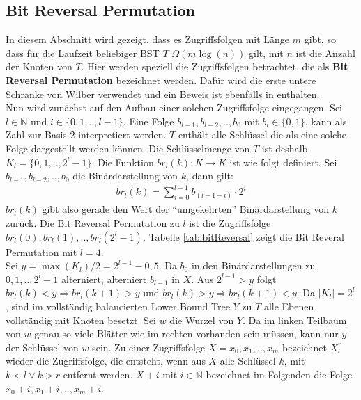 \documentclass[a4paper,12pt]{article}
\begin{document}
\subsection{Bit Reversal Permutation } \label{abschnittBitReversal}
In diesem Abschnitt wird gezeigt, dass es Zugriffsfolgen mit Länge $m$ gibt, so dass für die Laufzeit beliebiger BST $T$ $\Omega\left(m \log\left( n\right)\right)$ gilt, mit $n$ ist die Anzahl der Knoten von $T$. Hier werden speziell die Zugriffsfolgen betrachtet, die als \textbf{Bit Reversal Permutation} bezeichnet werden. 
Dafür wird die erste untere Schranke von Wilber verwendet und ein Beweis ist ebenfalls in \cite{wilberLowerBounds} enthalten. \\
Nun wird zunächst auf den Aufbau einer solchen Zugriffsfolge eingegangen. Sei $l \in \mathbb{N}$ und $i \in \{0,1,..,l-1\}$. Eine Folge  $b_{l-1},b_{l-2},..,b_0$ mit $b_i \in \{0,1\}$, kann als Zahl zur Basis $2$ interpretiert werden. $T$ enthält alle Schlüssel die als eine solche Folge dargestellt werden können. Die Schlüsselmenge von $T$ ist deshalb $K_l = \{0,1,..,2^l -1\}$. 
Die Funktion $\mathit{br}_l(k)\colon K \rightarrow K$ ist wie folgt definiert. Sei {$b_{l-1},b_{l-2},..,b_{0}$} die Binärdarstellung von $k$, dann gilt:
\begin{align*}
\mathit{br}_l(k) = \sum_{i = 0}^{l-1} b_{\left(l-1-i\right)} \cdot 2^i
\end{align*}
$\mathit{br}_l(k)$ gibt also gerade den Wert der \enquote{umgekehrten} Binärdarstellung von $k$ zurück. Die Bit Reversal Permutation zu $l$ ist die Zugriffsfolge\\ ${\mathit{br}_l(0),\mathit{br}_l(1),..,\mathit{br}_l(2^l-1)}$. Tabelle \ref{tab:bitReversal} zeigt die Bit Reveral Permutation mit $l  = 4$.\\
 Sei $y = \max\left(K_l\right) /2 = 2^{l-1} - 0,5 $. Da $b_0$ in den Binärdarstellungen zu $0, 1,.., 2^l-1$ alterniert, alterniert $b_{l-1}$ in $X$. Aus $2^{l-1} > y$ folgt \\ $\mathit{br}_l(k) < y \Rightarrow \mathit{br}_l(k +1) > y$ und $\mathit{br}_l(k) > y \Rightarrow \mathit{br}_l(k +1) < y$. Da $\vert K_l \vert = 2^l$, sind im vollständig balancierten Lower Bound Tree $Y$ zu $T$ alle Ebenen vollständig mit Knoten besetzt. Sei $w$ die Wurzel von $Y$. Da im linken Teilbaum von $w$ genau so viele Blätter wie im rechten vorhanden sein müssen, kann nur $y$ der Schlüssel von $w$ sein. Zu einer Zugriffsfolge $X = x_0,x_1,..,x_m$ bezeichnet $X^r_l$ wieder die Zugriffsfolge, die entsteht, wenn aus $X$ alle Schlüssel $k$, mit $k < l \lor k > r$ entfernt werden. $X + i$ mit $i \in \mathbb{N}$ bezeichnet im Folgenden die Folge $x_0 + i, x_1 + i,.., x_m + i$.\\
\end{document}
